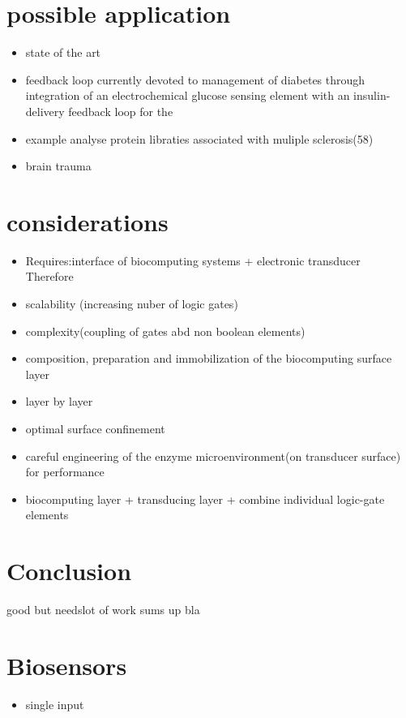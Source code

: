 \documentclass[runningheads]{llncs}
\begin{document}
\section{possible application}
	\begin{itemize}
		\item state of the art
		\item feedback loop currently devoted to management of diabetes through integration of an electrochemical glucose sensing element with an insulin-delivery feedback loop for the
		\item example analyse protein libraties associated with muliple sclerosis(58)
		\item brain trauma
	\end{itemize}



\section{considerations}
	\begin{itemize}
		\item Requires:interface of biocomputing systems + electronic transducer\\
		Therefore
		\item scalability (increasing nuber of logic gates)
		\item complexity(coupling of gates abd non boolean elements)
		\item composition, preparation and immobilization of the biocomputing surface layer
		\item layer by layer
		\item optimal surface confinement 
		\item careful engineering of the enzyme microenvironment(on transducer surface) for performance
		\item biocomputing layer + transducing layer + combine individual logic-gate elements	
	\end{itemize}



\section{Conclusion}
	good but needslot of work
	sums up bla


 
\section{Biosensors}
	\begin{itemize}
		\item single input
	\end{itemize}
\end{document}
